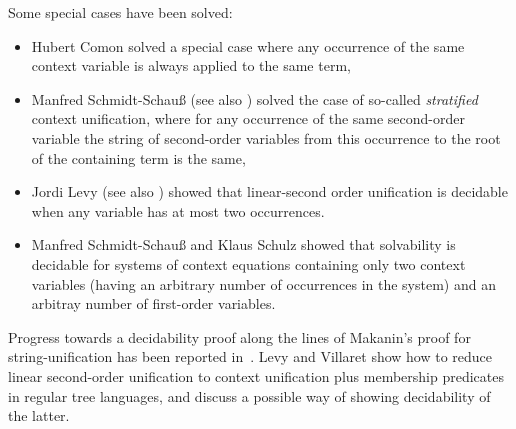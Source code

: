 \documentclass[11pt]{article}
\begin{document}
Some special cases have been solved:
\begin{itemize}
\item Hubert Comon \cite{Comon:rr699} solved a special case where
        any occurrence of the same context variable is always applied
        to the same term,
\item Manfred Schmidt-Schau{\ss} \cite{Schauss:rr94-12} (see also
        \cite{schmidt-schauss:jsc97}) solved the case of so-called
        {\em stratified} context unification, where for any occurrence
        of the same second-order variable the string of
        second-order variables from this occurrence to the root of the
        containing term is the same,
\item Jordi Levy \cite{Levy:rta96} (see also \cite{Niehren:cade97})
        showed that linear-second order 
        unification is decidable when any variable has at most two
        occurrences.
\item Manfred Schmidt-Schau{\ss} and Klaus Schulz \cite{Schauss:cade99}
        showed that solvability is decidable for systems of
        context equations containing only two context variables (having
        an arbitrary number of occurrences in the system) and an
        arbitray number of first-order variables.
\end{itemize}

Progress towards a decidability proof along the lines
of Makanin's proof for string-unification has been reported
in~\cite{schmidt-schauss:rta98}. Levy and Villaret \cite{Levy:rta00}
show how to reduce linear second-order unification to context
unification plus membership predicates in regular tree languages, and
discuss a possible way of showing decidability of the latter.
\nocite{Schauss:cisrep99}



\end{document}
